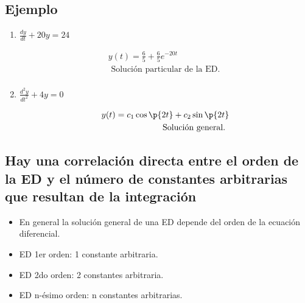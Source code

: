 \subsection{Ejemplo}
\begin{enumerate}
    \item $\displaystyle \frac{d y}{d t} + 20y=24$ 
        \begin{center}
           \begin{align*}
               y(t) = \frac{6}{5}+\frac{6}{5}e^{-20t} \\ 
               \text{ Solución particular de la ED. } \\ 
           \end{align*}
        \end{center}
    
    \item $\displaystyle \frac{d ^2y}{d t^2}+4y=0 $ 
        \begin{center}
           \begin{align*}
               y(t) = c_1\cos\p{ 2t } +c_2\sin\p{ 2t } \\ 
               \text{ Solución general. } \\ 
           \end{align*}
        \end{center}
\end{enumerate}

\subsection{Hay una correlación directa entre el orden de la ED y el número de constantes arbitrarias que resultan de la integración}
\begin{itemize}
    \item En general la solución general de una ED depende del orden de la ecuación diferencial.
    \item ED 1er orden: 1 constante arbitraria.
    \item ED 2do orden: 2 constantes arbitraria.
    \item ED n-ésimo orden: n constantes arbitrarias.
\end{itemize}

